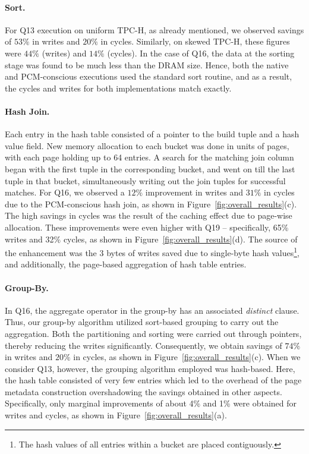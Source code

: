 \paragraph{Sort.}
For Q13 execution on uniform TPC-H, as already mentioned, we observed 
savings of $53\%$ in writes and $20\%$ in cycles. Similarly, on skewed TPC-H, these  
figures were $44\%$ (writes) and $14\%$ (cycles). 
In the case of Q16, the data at the sorting stage was
found to be much less than the DRAM size. Hence, both the native and
PCM-conscious executions used the standard sort routine, and as a result,
the cycles and writes for both implementations match exactly.

\paragraph{Hash Join.}
Each entry in the hash table consisted of a pointer to the build tuple
and a hash value field. New memory allocation to each bucket was done
in units of pages, with each page holding up to 64 entries. A search for
the matching join column began with the first tuple in the corresponding
bucket, and went on till the last tuple in that bucket, simultaneously
writing out the join tuples for successful matches.  For Q16, we
observed a $12\%$ improvement in writes and $31\%$ in cycles due to the
PCM-conscious hash join, as shown in Figure~\ref{fig:overall_results}(c). The
high savings in cycles was the result of the caching effect due to page-wise
allocation.
These improvements were even higher with Q19  -- specifically, 65\% writes and 32\%
cycles, as shown in Figure~\ref{fig:overall_results}(d). The source of the
enhancement was the 3 bytes of writes saved due to single-byte hash
values\footnote{The hash values of all entries within a bucket are placed
contiguously.}, and additionally, the page-based aggregation of hash table
entries.


\paragraph{Group-By.}
In Q16, the aggregate operator in the group-by has an associated
\textit{distinct} clause.  Thus, our group-by algorithm utilized
sort-based grouping to carry out the
aggregation. Both the partitioning and sorting were carried out through
pointers, thereby reducing the writes significantly. Consequently,
we obtain savings of $74\%$ in writes and $20\%$ in cycles, as shown
in Figure~\ref{fig:overall_results}(c).  When we consider Q13, however,
the grouping algorithm employed was hash-based. Here, the hash table consisted
of very few entries which led to the overhead of the page metadata construction
overshadowing the
savings obtained in other aspects. Specifically, only marginal improvements
of about 4\% and 1\% were obtained for writes and cycles, as shown in
Figure~\ref{fig:overall_results}(a).




